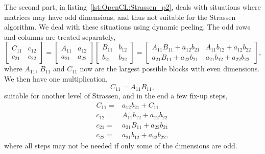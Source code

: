 The second part, in listing~\ref{lst:OpenCL:Strassen_p2}, deals with situations where matrices may have odd dimensions, and thus not suitable for the Strassen algorithm.
We deal with these situations using dynamic peeling.
The odd rows and columns are treated separately,
\begin{equation}
\begin{bmatrix}
C_{11}  & c_{12} \\
c_{21}  & c_{22}
\end{bmatrix}
=
\begin{bmatrix}
A_{11} & a_{12} \\
a_{21} & a_{22} 
\end{bmatrix}
\begin{bmatrix}
B_{11} & b_{12} \\
b_{21} & b_{22} 
\end{bmatrix}
= 
\begin{bmatrix}
A_{11}B_{11} + a_{12}b_{21}  & A_{11}b_{12} + a_{12}b_{22} \\
a_{21}B_{11} + a_{22}b_{21}  & a_{21}b_{12} + a_{22}b_{22} 
\end{bmatrix} , 
\end{equation}
where $A_{11}$, $B_{11}$ and $C_{11}$ now are the largest possible blocks with even dimensions.
We then have one multiplication,
\begin{equation}
C_{11} = A_{11}B_{11} , 
\end{equation}
suitable for another level of Strassen, and in the end a few fix-up steps,
\begin{equation}
\begin{split}
C_{11} =&  a_{12}b_{21}  + C_{11} \\
c_{12} =& A_{11}b_{12} + a_{12}b_{22} \\
c_{21} =& a_{21}B_{11} + a_{22}b_{21} \\
c_{22} =& a_{21}b_{12} + a_{22}b_{22} ,
\end{split}
\end{equation}
where all steps may not be needed if only some of the dimensions are odd.
